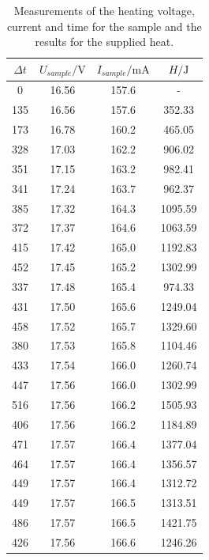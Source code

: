 \begin{table}[htbp] 
    \centering 
    \begin{tabular}{ccc | c} 
        \toprule $\Delta t$ & $U_{sample}/\unit{\volt}$ & $I_{sample}/\unit{\milli\ampere}$ & $H/\unit{\joule}$\\ 
        \midrule 
        0   & 16.56 & 157.6 & - \\   
        135 & 16.56 & 157.6 & 352.33   \\
        173 & 16.78 & 160.2 & 465.05  \\
        328 & 17.03 & 162.2 & 906.02   \\
        351 & 17.15 & 163.2 & 982.41   \\
        341 & 17.24 & 163.7 & 962.37\\
        385 & 17.32 & 164.3 & 1095.59  \\
        372 & 17.37 & 164.6 & 1063.59  \\
        415 & 17.42 & 165.0 & 1192.83    \\
        452 & 17.45 & 165.2 & 1302.99   \\
        337 & 17.48 & 165.4 & 974.33  \\
        431 & 17.50 & 165.6 & 1249.04 \\
        458 & 17.52 & 165.7 & 1329.60 \\
        380 & 17.53 & 165.8 & 1104.46  \\
        433 & 17.54 & 166.0 & 1260.74  \\
        447 & 17.56 & 166.0 & 1302.99   \\
        516 & 17.56 & 166.2 & 1505.93  \\
        406 & 17.56 & 166.2 & 1184.89 \\
        471 & 17.57 & 166.4 & 1377.04  \\
        464 & 17.57 & 166.4 & 1356.57  \\
        449 & 17.57 & 166.4 & 1312.72  \\
        449 & 17.57 & 166.5 & 1313.51  \\
        486 & 17.57 & 166.5 & 1421.75  \\
        426 & 17.56 & 166.6 & 1246.26 \\
        \bottomrule 
    \end{tabular} 
    \caption[Tabelle]{Measurements of the heating voltage, current and time for the sample and the results for the supplied heat.} 
    \label{tab:heat} 
\end{table}

